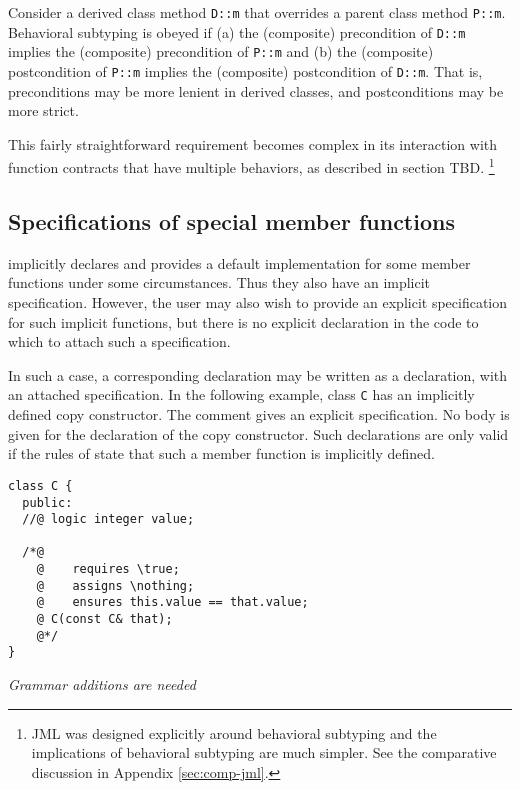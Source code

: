 Consider a derived class method \lstinline|D::m| that overrides a parent class method \lstinline|P::m|.
Behavioral subtyping is obeyed if (a) the (composite) precondition of
\lstinline|D::m| implies the (composite) precondition of 
\lstinline|P::m| and (b) the (composite) postcondition of
\lstinline|P::m| implies the (composite) postcondition of 
\lstinline|D::m|. That is, preconditions may be more lenient in derived classes, and postconditions may be more strict. 

This fairly straightforward requirement becomes complex in its interaction with function contracts that have multiple behaviors, 
as described in section TBD.
\footnote{JML was designed explicitly around behavioral subtyping and the implications of behavioral subtyping are much simpler. 
	See the comparative discussion in Appendix \ref{sec:comp-jml}.}


\subsection{Specifications of special member functions}

\lang{} implicitly declares and provides a default implementation for some member functions under some circumstances. 
Thus they also have an implicit specification. However, the user may also wish to provide an explicit specification for such implicit functions, but there is no
explicit declaration in the \lang{} code to which to attach such a 
specification.

In such a case, a corresponding declaration may be written as a \NAME{} 
declaration, with an attached specification. 
In the following example, class \lstinline|C| has an implicitly defined
copy constructor. The \NAME{} comment gives an explicit specification.
No body is given for the declaration of the \lang{} copy constructor.
Such declarations are only valid if the rules of \lang{} state that such
a member function is implicitly defined.
\begin{lstlisting}
class C {
  public:
  //@ logic integer value;
  
  /*@
    @    requires \true;
    @    assigns \nothing;
    @    ensures this.value == that.value;
    @ C(const C& that);
    @*/
}
\end{lstlisting}

\emph{Grammar additions are needed}

